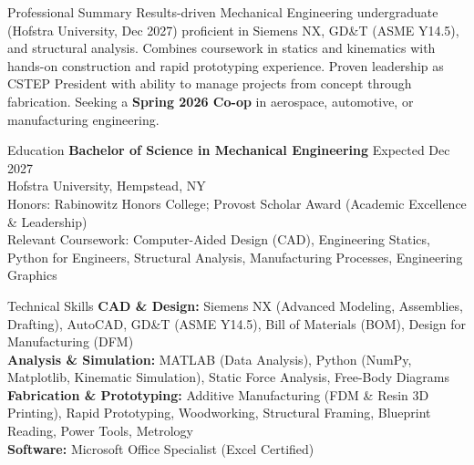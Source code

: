 \documentclass{resume}
\begin{document}
\printheader

\begin{rSection}{Professional Summary}
Results-driven Mechanical Engineering undergraduate (Hofstra University, Dec 2027) proficient in Siemens NX, GD\&T (ASME Y14.5), and structural analysis. Combines coursework in statics and kinematics with hands-on construction and rapid prototyping experience. Proven leadership as CSTEP President with ability to manage projects from concept through fabrication. Seeking a \textbf{Spring 2026 Co-op} in aerospace, automotive, or manufacturing engineering.
\end{rSection}

\begin{rSection}{Education}
{\bf Bachelor of Science in Mechanical Engineering} \hfill {Expected Dec 2027}\\
Hofstra University, Hempstead, NY\\
Honors: Rabinowitz Honors College; Provost Scholar Award (Academic Excellence \& Leadership)\\
Relevant Coursework: Computer-Aided Design (CAD), Engineering Statics, Python for Engineers, Structural Analysis, Manufacturing Processes, Engineering Graphics
\end{rSection}

\begin{rSection}{Technical Skills}
{\bf CAD \& Design:} Siemens NX (Advanced Modeling, Assemblies, Drafting), AutoCAD, GD\&T (ASME Y14.5), Bill of Materials (BOM), Design for Manufacturing (DFM)\\
{\bf Analysis \& Simulation:} MATLAB (Data Analysis), Python (NumPy, Matplotlib, Kinematic Simulation), Static Force Analysis, Free-Body Diagrams\\
{\bf Fabrication \& Prototyping:} Additive Manufacturing (FDM \& Resin 3D Printing), Rapid Prototyping, Woodworking, Structural Framing, Blueprint Reading, Power Tools, Metrology\\
{\bf Software:} Microsoft Office Specialist (Excel Certified)
\end{rSection}
\end{document}
